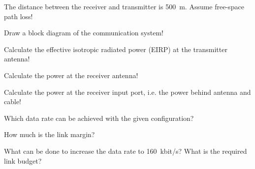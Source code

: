 \begin{question}[subtitle={Link Budget}]
	The distance between the receiver and transmitter is \SI{500}{m}. Assume free-space path loss!
	
	\begin{tasks}
		\task
		Draw a block diagram of the communication system!
		
		\task
		Calculate the effective isotropic radiated power (EIRP) at the transmitter antenna!
		
		\task
		Calculate the power at the receiver antenna!
		
		\task
		Calculate the power at the receiver input port, i.e. the power behind antenna and cable!
		
		\task
		Which data rate can be achieved with the given configuration?
		
		\task
		How much is the link margin?
		
		\task
		What can be done to increase the data rate to \SI{160}{kbit/s}? What is the required link budget?
	\end{tasks}
\end{question}

